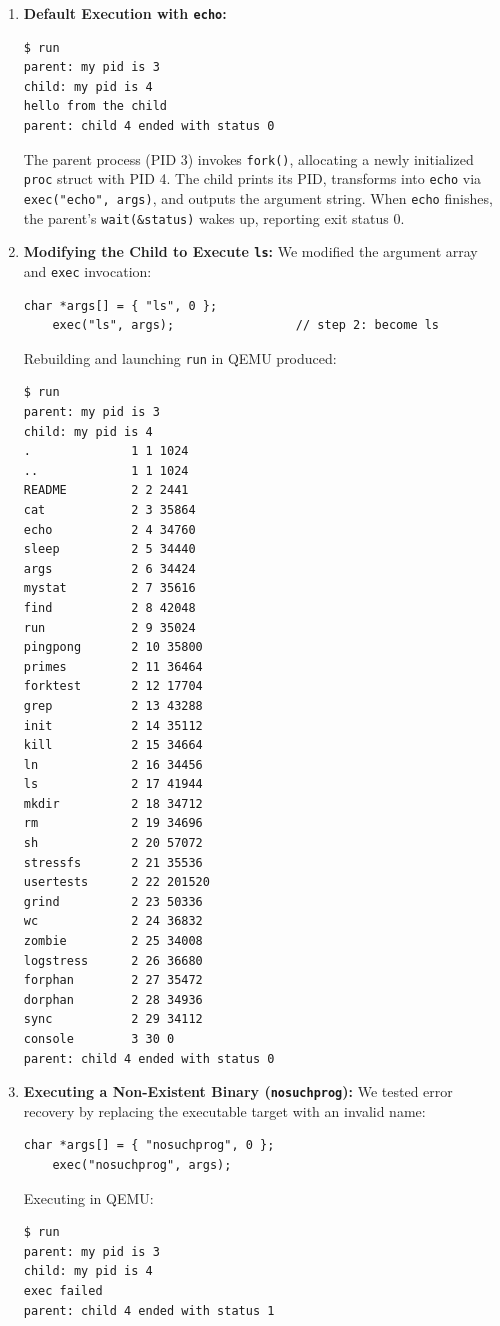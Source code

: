 \documentclass{labreport}
\begin{document}
\begin{enumerate}[leftmargin=*]
    \item \textbf{Default Execution with \texttt{echo}:}
\begin{lstlisting}[style=bash]
$ run
parent: my pid is 3
child: my pid is 4
hello from the child
parent: child 4 ended with status 0
\end{lstlisting}
    The parent process (PID 3) invokes \texttt{fork()}, allocating a newly initialized \texttt{proc} struct with PID 4. The child prints its PID, transforms into \texttt{echo} via \texttt{exec("echo", args)}, and outputs the argument string. When \texttt{echo} finishes, the parent's \texttt{wait(\&status)} wakes up, reporting exit status 0.

    \item \textbf{Modifying the Child to Execute \texttt{ls}:}
    We modified the argument array and \texttt{exec} invocation:
\begin{lstlisting}[style=c]
    char *args[] = { "ls", 0 };
    exec("ls", args);                 // step 2: become ls
\end{lstlisting}
    Rebuilding and launching \texttt{run} in QEMU produced:
\begin{lstlisting}[style=bash]
$ run
parent: my pid is 3
child: my pid is 4
.              1 1 1024
..             1 1 1024
README         2 2 2441
cat            2 3 35864
echo           2 4 34760
sleep          2 5 34440
args           2 6 34424
mystat         2 7 35616
find           2 8 42048
run            2 9 35024
pingpong       2 10 35800
primes         2 11 36464
forktest       2 12 17704
grep           2 13 43288
init           2 14 35112
kill           2 15 34664
ln             2 16 34456
ls             2 17 41944
mkdir          2 18 34712
rm             2 19 34696
sh             2 20 57072
stressfs       2 21 35536
usertests      2 22 201520
grind          2 23 50336
wc             2 24 36832
zombie         2 25 34008
logstress      2 26 36680
forphan        2 27 35472
dorphan        2 28 34936
sync           2 29 34112
console        3 30 0
parent: child 4 ended with status 0
\end{lstlisting}

    \item \textbf{Executing a Non-Existent Binary (\texttt{nosuchprog}):}
    We tested error recovery by replacing the executable target with an invalid name:
\begin{lstlisting}[style=c]
    char *args[] = { "nosuchprog", 0 };
    exec("nosuchprog", args);
\end{lstlisting}
    Executing in QEMU:
\begin{lstlisting}[style=bash]
$ run
parent: my pid is 3
child: my pid is 4
exec failed
parent: child 4 ended with status 1
\end{lstlisting}
\end{enumerate}
\end{document}
